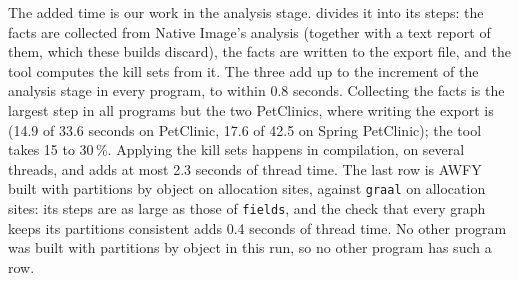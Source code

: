The added time is our work in the analysis stage.  divides it into its steps: the facts are collected from
Native Image's analysis (together with a text report of them, which these builds discard), the facts are written to the export
file, and the tool computes the kill sets from it. The three add up to the increment of the analysis stage in every program, to within 0.8 seconds. Collecting the facts is the
largest step in all programs but the two PetClinics, where writing the export is (14.9 of 33.6 seconds on PetClinic, 17.6 of
42.5 on Spring PetClinic); the tool takes 15 to 30\,\%. Applying the kill sets happens in compilation, on several threads, and
adds at most 2.3 seconds of thread time. The last row is AWFY built with partitions by object on allocation sites, against
\texttt{graal} on allocation sites: its steps are as large as those of \texttt{fields}, and the check that every graph keeps
its partitions consistent adds 0.4 seconds of thread time. No other program was built with partitions by object in this run,
so no other program has such a row.

